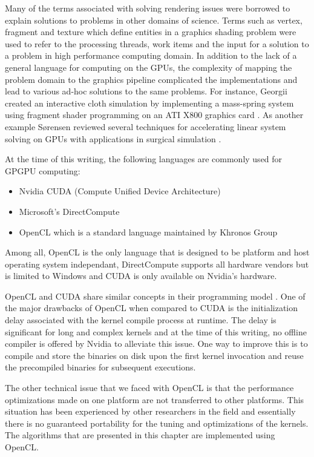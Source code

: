 Many of the terms associated with solving rendering issues were borrowed to explain solutions to problems in 
other domains of science. Terms such as vertex, fragment and texture which define entities in a graphics 
shading problem were used to refer to the processing threads, work items and the input for a solution to a 
problem in high performance computing domain. In addition to the lack of a general language for computing on the GPUs, 
the complexity of mapping the problem domain to the graphics pipeline complicated the implementations and lead 
to various ad-hoc solutions to the same problems. For instance, Georgii \etal created an interactive cloth simulation 
by implementing a mass-spring system using fragment shader programming on an ATI X800 graphics card \cite{Georgii2005}. 
As another example S{\o}rensen \etal reviewed several techniques for accelerating linear system solving on GPUs
with applications in surgical simulation \cite{Sørensen2006a}. 

At the time of this writing, the following languages are commonly used for GPGPU computing:
\begin{itemize}
 \item Nvidia CUDA (Compute Unified Device Architecture)
 \item Microsoft's DirectCompute
 \item OpenCL which is a standard language maintained by Khronos Group
\end{itemize}

Among all, OpenCL is the only language that is designed to be platform and 
host operating system independant, DirectCompute supports all hardware vendors
but is limited to Windows and CUDA is only available on Nvidia's hardware. 

OpenCL and CUDA share similar concepts in their programming model \cite{gaster2012heterogeneous}.
One of the major drawbacks of OpenCL when compared to CUDA is the initialization delay 
associated with the kernel compile process at runtime. The delay is significant for long
and complex kernels and at the time of this writing, no offline compiler is offered by Nvidia
to alleviate this issue. One way to improve this is to compile and store the binaries 
on disk upon the first kernel invocation and reuse the precompiled binaries for subsequent 
executions. 

The other technical issue that we faced with OpenCL is that the performance optimizations 
made on one platform are not transferred to other platforms. This situation has been experienced
by other researchers in the field and essentially there is no guaranteed portability for the 
tuning and optimizations of the kernels.
The algorithms that are presented in this chapter are implemented using OpenCL. 

